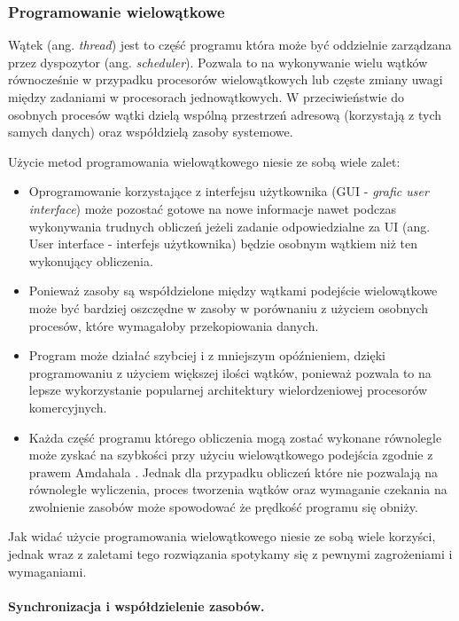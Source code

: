 \subsubsection{Programowanie wielowątkowe}

Wątek (ang. \textit{thread}) jest to część programu która może być oddzielnie zarządzana przez dyspozytor (ang. \textit{scheduler}). 
Pozwala to na wykonywanie wielu wątków równocześnie w przypadku procesorów wielowątkowych lub częste zmiany uwagi między zadaniami w procesorach jednowątkowych.
W przeciwieństwie do osobnych procesów wątki dzielą wspólną przestrzeń adresową (korzystają z tych samych danych) oraz współdzielą zasoby systemowe.

Użycie metod programowania wielowątkowego niesie ze sobą wiele zalet:
\begin{itemize}
        \item Oprogramowanie korzystające z interfejsu użytkownika (GUI - \textit{grafic user interface}) może pozostać gotowe na nowe informacje nawet podczas wykonywania trudnych obliczeń jeżeli zadanie odpowiedzialne za UI (ang. User interface - interfejs użytkownika) będzie osobnym wątkiem niż ten wykonujący obliczenia.
        \item Ponieważ zasoby są współdzielone między wątkami podejście wielowątkowe może być bardziej oszczędne w zasoby w porównaniu z użyciem osobnych procesów, które wymagałoby przekopiowania danych.
        \item Program może działać szybciej i z mniejszym opóźnieniem, dzięki programowaniu z użyciem większej ilości wątków, ponieważ pozwala to na lepsze wykorzystanie popularnej architektury wielordzeniowej procesorów komercyjnych. 
        \item Każda część programu którego obliczenia mogą zostać wykonane równolegle może zyskać na szybkości przy użyciu wielowątkowego podejścia zgodnie z prawem Amdahala \cite{arch}. 
        Jednak dla przypadku obliczeń które nie pozwalają na równoległe wyliczenia, proces tworzenia wątków oraz wymaganie czekania na zwolnienie zasobów może spowodować że prędkość programu się obniży.
\end{itemize}
Jak widać użycie programowania wielowątkowego niesie ze sobą wiele korzyści,
jednak wraz z zaletami tego rozwiązania spotykamy się z pewnymi zagrożeniami i wymaganiami.

\paragraph{Synchronizacja i współdzielenie zasobów.}

